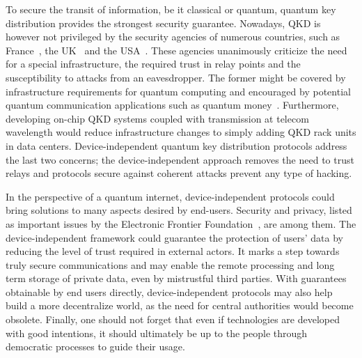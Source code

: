 To secure the transit of information, be it classical or quantum, quantum key distribution provides the strongest security guarantee.
Nowadays, QKD is however not privileged by the security agencies of numerous countries, such as France~\cite{ANSSI2020}, the UK~\cite{NCSC2020} and the USA~\cite{NSA2020}.
These agencies unanimously criticize the need for a special infrastructure, the required trust in relay points and the susceptibility to attacks from an eavesdropper.
The former might be covered by infrastructure requirements for quantum computing and encouraged by potential quantum communication applications such as quantum money~\cite{Wiesner1983,Molina2013}.
Furthermore, developing on-chip QKD systems coupled with transmission at telecom wavelength would reduce infrastructure changes to simply adding QKD rack units in data centers. 
Device-independent quantum key distribution protocols address the last two concerns; the device-independent approach removes the need to trust relays and protocols secure against coherent attacks prevent any type of hacking.

\medbreak

In the perspective of a quantum internet, device-independent protocols could bring solutions to many aspects desired by end-users.
Security and privacy, listed as important issues by the Electronic Frontier Foundation~\cite{EFFPrivacy,EFFSecurity}, are among them.
The device-independent framework could guarantee the protection of users' data by reducing the level of trust required in external actors.
It marks a step towards truly secure communications and may enable the remote processing and long term storage of private data, even by mistrustful third parties.
With guarantees obtainable by end users directly, device-independent protocols may also help build a more decentralize world, as the need for central authorities would become obsolete.
Finally, one should not forget that even if technologies are developed with good intentions, it should ultimately be up to the people through democratic processes to guide their usage.
